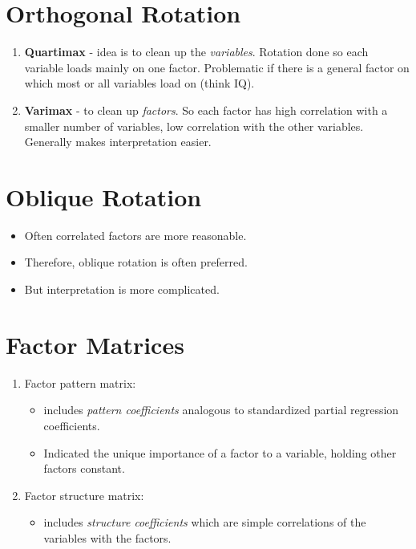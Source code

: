 \documentclass[
]{book}
\providecommand{\tightlist}{%
  \setlength{\itemsep}{0pt}\setlength{\parskip}{0pt}}
\begin{document}
\hypertarget{orthogonal-rotation}{%
\section{Orthogonal Rotation}\label{orthogonal-rotation}}

\begin{enumerate}
\def\labelenumi{\arabic{enumi}.}
\item
  \textbf{Quartimax} - idea is to clean up the \emph{variables}. Rotation done so each variable loads mainly on one factor. Problematic if there is a general factor on which most or all variables load on (think IQ).
\item
  \textbf{Varimax} - to clean up \emph{factors}. So each factor has high correlation with a smaller number of variables, low correlation with the other variables. Generally makes interpretation easier.
\end{enumerate}

\hypertarget{oblique-rotation}{%
\section{Oblique Rotation}\label{oblique-rotation}}

\begin{itemize}
\tightlist
\item
  Often correlated factors are more reasonable.
\item
  Therefore, oblique rotation is often preferred.
\item
  But interpretation is more complicated.
\end{itemize}

\hypertarget{factor-matrices}{%
\section{Factor Matrices}\label{factor-matrices}}

\begin{enumerate}
\def\labelenumi{\arabic{enumi}.}
\tightlist
\item
  Factor pattern matrix:

  \begin{itemize}
  \tightlist
  \item
    includes \emph{pattern coefficients} analogous to standardized partial regression coefficients.
  \item
    Indicated the unique importance of a factor to a variable, holding other factors constant.
  \end{itemize}
\item
  Factor structure matrix:

  \begin{itemize}
  \tightlist
  \item
    includes \emph{structure coefficients} which are simple correlations of the variables with the factors.
  \end{itemize}
\end{enumerate}
\end{document}
